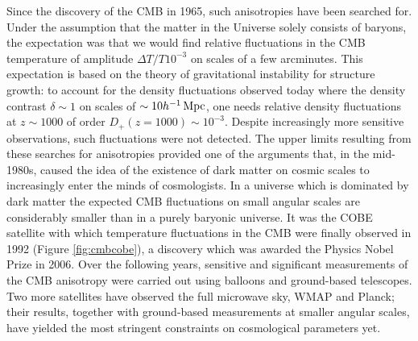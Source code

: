 \documentclass[a4paper,11pt]{article}
\begin{document}
{\noindent}Since the discovery of the CMB in 1965, such anisotropies have been searched for. Under the assumption that the matter in the Universe solely consists of baryons, the expectation was that we would find relative fluctuations in the CMB temperature of amplitude $\Delta T/T10^{-3}$ on scales of a few arcminutes. This expectation is based on the theory of gravitational instability for structure growth: to account for the density fluctuations observed today where the density contrast $\delta\sim1$ on scales of $\sim10h^{-1}\,{\rm Mpc}$, one needs relative density fluctuations at $z\sim1000$ of order $D_+(z=1000)\sim10^{-3}$. Despite increasingly more sensitive observations, such fluctuations were not detected. The upper limits resulting from these searches for anisotropies provided one of the arguments that, in the mid-1980s, caused the idea of the existence of dark matter on cosmic scales to increasingly enter the minds of cosmologists. In a universe which is dominated by dark matter the expected CMB fluctuations on small angular scales are considerably smaller than in a purely baryonic universe. It was the COBE satellite with which temperature fluctuations in the CMB were finally observed in 1992 (Figure \ref{fig:cmbcobe}), a discovery which was awarded the Physics Nobel Prize in 2006. Over the following years, sensitive and significant measurements of the CMB anisotropy were carried out using balloons and ground-based telescopes. Two more satellites have observed the full microwave sky, WMAP and Planck; their results, together with ground-based measurements at smaller angular scales, have yielded the most stringent constraints on cosmological parameters yet.
\end{document}
